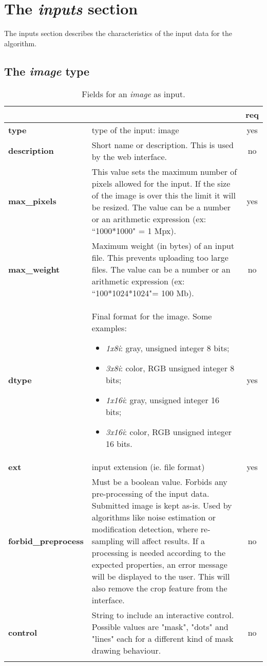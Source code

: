 \section{The \emph{inputs} section}
The inputs section describes the characteristics of the input data for the algorithm.

\subsection{The \emph{image} type}

\begin{longtable}{|>{\bf}L{\linewidth}|L{\linewidth}|c|}
\hline
{}     &  & {\bf req} \tabularnewline 
\hline \hline
 type         & type of the input: image & yes \\ \hline
 description  & Short name or description. This is used by the web interface. & no \\ \hline
 max\_pixels  & This value sets the maximum number of pixels allowed for the input. If the size of the image is over this the limit it will be resized. The value can be a number or an arithmetic expression (ex:  ``1000*1000" = 1 Mpx).  & yes \\ \hline
 max\_weight   & Maximum weight (in bytes) of an input file. This prevents uploading too large files. The value can be a number or an arithmetic expression (ex: ``100*1024*1024"= 100 Mb). & no \\ \hline
 dtype        & Final format for the image. Some examples:
\begin{itemize}
  \setlength\itemsep{-0.5em}
  \item \textit{1x8i}: gray, unsigned integer 8 bits;
  \item \textit{3x8i}: color, RGB unsigned integer 8 bits;
  \item \textit{1x16i}: gray, unsigned integer 16 bits;
  \item \textit{3x16i}: color, RGB unsigned integer 16 bits.
\end{itemize} 
 & yes \\ \hline
 ext          & input extension (ie. file format) & yes \\ \hline
forbid\_preprocess & Must be a boolean value. Forbids any pre-processing of the input data.
Submitted image is kept as-is. Used by algorithms like noise estimation or modification detection, where re-sampling will affect results. 
If a processing is needed according to the expected properties, an error message will be displayed to the user. This will also remove the crop feature from the interface.
& no \\ \hline
 control & String to include an interactive control. Possible values are "mask", "dots" and "lines" each for a different kind of mask drawing behaviour. & no \\ \hline
\caption{Fields for an \emph{image} as input.}
\end{longtable}

